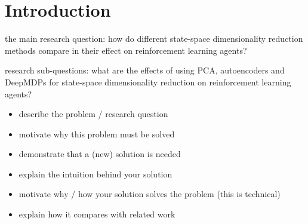 \chapter{Introduction}\label{introduction}

the main research question: how do different state-space dimensionality reduction methods compare in their effect on reinforcement learning agents?

research sub-questions: what are the effects of using PCA, autoencoders and DeepMDPs for state-space dimensionality reduction on reinforcement learning agents? 

\begin{itemize}
\item describe the problem / research question
\item motivate why this problem must be solved
\item demonstrate that a (new) solution is needed
\item explain the intuition behind your solution
\item motivate why / how your solution solves the problem (this is technical)
\item explain how it compares with related work
\end{itemize}
%
